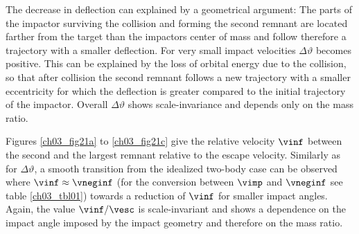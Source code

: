 The decrease in deflection can explained by a geometrical argument: The parts of the impactor surviving the collision and forming the second remnant are located farther from the target than the impactors center of mass and follow therefore a trajectory with a smaller deflection. For very small impact velocities $\Delta \vartheta$ becomes positive. This can be explained by the loss of orbital energy due to the collision, so that after collision the second remnant follows a new trajectory with a smaller eccentricity for which the deflection is greater compared to the initial trajectory of the impactor. Overall $\Delta \vartheta$ shows scale-invariance and depends only on the mass ratio.

Figures \ref{ch03_fig21a} to \ref{ch03_fig21c} give the relative velocity $\vinf$ between the second and the largest remnant relative to the escape velocity. Similarly as for $\Delta \vartheta$, a smooth transition from the idealized two-body case can be observed where $\vinf \approx \vneginf$ (for the conversion between $\vimp$ and $\vneginf$ see table \ref{ch03_tbl01}) towards a reduction of $\vinf$ for smaller impact angles. Again, the value $\vinf / \vesc$ is scale-invariant and shows a dependence on the impact angle imposed by the impact geometry and therefore on the mass ratio.

